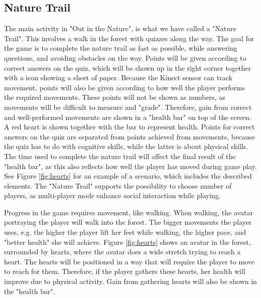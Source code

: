 \subsection{Nature Trail}
The main activity in "Out in the Nature", is what we have called a "Nature Trail". This involves a walk in the forest with quizzes along the way. The goal for the game is to complete the nature trail as fast as possible, while answering questions, and avoiding obstacles on the way. Points will be given according to correct answers on the quiz, which will be shown up in the right corner together with a icon showing a sheet of paper. Because the Kinect sensor can track movement, points will also be given according to how well the player performs the required movements. These points will not be shown as numbers, as movements will be difficult to measure and "grade". Therefore, gain from correct and well-performed movements are shown in a "health bar" on top of the screen. A red heart is shown together with the bar to represent health. Points for correct answers on the quiz are separated from points achieved from movements, because the quiz has to do with cognitive skills, while the latter is about physical skills. The time used to complete the nature trail will affect the final result of the "health bar", as this also reflects how well the player has moved during game play. See Figure \ref{fig:hearts} for an example of a scenario, which includes the described elements. The "Nature Trail" supports the possibility to choose number of players, as multi-player mode enhance social interaction while playing.  

Progress in the game requires movement, like walking. When walking, the avatar portraying the player will walk into the forest. The bigger movements the player uses, e.g. the higher the player lift her feet while walking, the higher pace, and "better health" she will achieve. Figure \ref{fig:hearts} shows an avatar in the forest, surrounded by hearts, where the avatar does a wide stretch trying to reach a heart. The hearts will be positioned in a way that will require the player to move to reach for them. Therefore, if the player gathers these hearts, her health will improve due to physical activity. Gain from gathering hearts will also be shown in the "health bar".   

